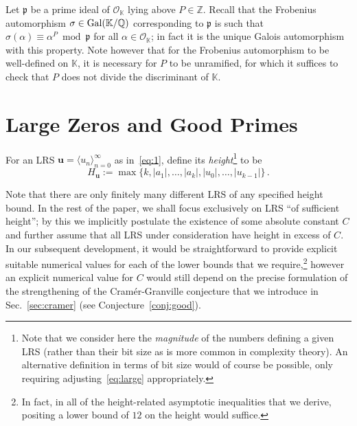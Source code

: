 \documentclass[preprint,12pt]{elsarticle}
\begin{document}
Let $\mathfrak{p}$ be a prime ideal of ${\mathcal O}_{\mathbb K}$
lying above $P\in\mathbb Z$.  Recall that the Frobenius automorphism
$\sigma\in {\rm Gal}({\mathbb K}/{\mathbb Q})$ corresponding
to $\mathfrak{p}$ is such that
$\sigma(\alpha) \equiv \alpha^P \bmod\mathfrak{p}$ for all
$\alpha \in \mathcal{O}_{\mathbb{K}}$; in fact it is the unique Galois
automorphism with this property. Note however that for the
Frobenius automorphism to be
well-defined on ${\mathbb K}$, it is necessary for $P$ to be
unramified, for which it suffices to check that $P$ does not
divide the discriminant of ${\mathbb K}$. 

\section{Large Zeros and Good Primes}
\label{sec:large-zeros}
For an LRS $\mathbf{u} = \langle u_n\rangle_{n=0}^\infty$ as
in~\eqref{eq:1}, define its \emph{height}\footnote{Note that we consider
  here the \emph{magnitude} of the numbers defining a given LRS (rather than their
  bit size as is more common in complexity theory). An alternative
  definition in terms of bit size would of course be possible, only
  requiring adjusting~\eqref{eq:large} appropriately.}
to be 
\[
H_{\mathbf{u}}:=\max\{k,|a_1|,\ldots,|a_k|,|u_0|,\ldots,|u_{k-1}|\}
\, .
\]

Note that there are only finitely many different LRS of any specified
height bound. In the rest of the paper, we shall focus exclusively on
LRS ``of sufficient height''; by this we implicitly postulate the
existence of some absolute constant $C$ and further assume that all
LRS under consideration have height in excess of $C$. In our
subsequent development, it would be straightforward to provide
explicit suitable numerical values for each of the lower bounds that
we require,\footnote{In fact, in all of the height-related asymptotic inequalities
  that we derive, positing a lower bound of $12$ on the height 
  would suffice.} however an explicit numerical value for $C$ would still depend
on the precise formulation of the strengthening of the
Cram\'er-Granville conjecture that we introduce in Sec.~\ref{sec:cramer} (see
Conjecture~\ref{conj:good}).
\end{document}
